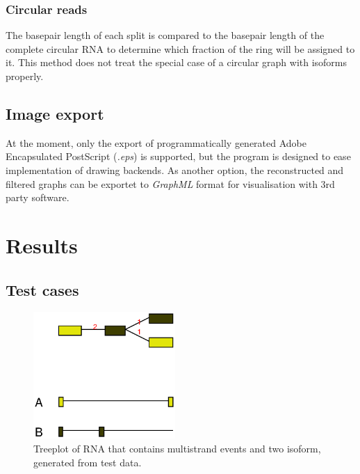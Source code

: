 \documentclass[11pt]{article}
\begin{document}
\subsubsection{Circular reads}
\label{sec-2-4-2}
\label{txt:circ2}

The basepair length of each split is compared to the basepair length of the complete circular RNA
to determine which fraction of the ring will be assigned to it.
This method does not treat the special case of a circular graph with isoforms properly.



\subsection{Image export}
\label{sec-2-5}

At the moment, only the export of programmatically generated Adobe Encapsulated PostScript (\emph{.eps})
is supported, but the program is designed to ease implementation of drawing backends.
As another option, the reconstructed and filtered graphs can be exportet to \emph{GraphML} format
for visualisation with 3rd party software.

\clearpage

\section{Results}
\label{sec-3}


\subsection{Test cases}
\label{sec-3-1}
\label{txt:test}

\begin{figure}
\centering
\includegraphics[width=0.48\textwidth]{./tree2.eps}
\caption[Multistrand tree plot of test data]{Treeplot of RNA that contains multistrand events and two isoform, generated from test data.}\label{fig-tree}
\end{figure}
\end{document}
